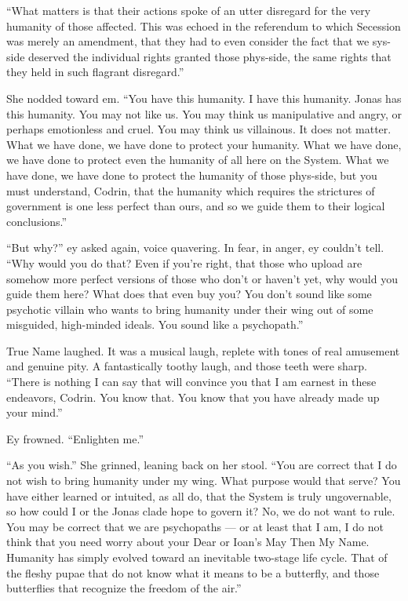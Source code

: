 ``What matters is that their actions spoke of an utter disregard for the very humanity of those affected. This was echoed in the referendum to which Secession was merely an amendment, that they had to even consider the fact that we sys-side deserved the individual rights granted those phys-side, the same rights that they held in such flagrant disregard.''

She nodded toward em. ``You have this humanity. I have this humanity. Jonas has this humanity. You may not like us. You may think us manipulative and angry, or perhaps emotionless and cruel. You may think us villainous. It does not matter. What we have done, we have done to protect your humanity. What we have done, we have done to protect even the humanity of all here on the System. What we have done, we have done to protect the humanity of those phys-side, but you must understand, Codrin, that the humanity which requires the strictures of government is one less perfect than ours, and so we guide them to their logical conclusions.''

``But why?'' ey asked again, voice quavering. In fear, in anger, ey couldn't tell. ``Why would you do that? Even if you're right, that those who upload are somehow more perfect versions of those who don't or haven't yet, why would you guide them here? What does that even buy you? You don't sound like some psychotic villain who wants to bring humanity under their wing out of some misguided, high-minded ideals. You sound like a psychopath.''

True Name laughed. It was a musical laugh, replete with tones of real amusement and genuine pity. A fantastically toothy laugh, and those teeth were sharp. ``There is nothing I can say that will convince you that I am earnest in these endeavors, Codrin. You know that. You know that you have already made up your mind.''

Ey frowned. ``Enlighten me.''

``As you wish.'' She grinned, leaning back on her stool. ``You are correct that I do not wish to bring humanity under my wing. What purpose would that serve? You have either learned or intuited, as all do, that the System is truly ungovernable, so how could I or the Jonas clade hope to govern it? No, we do not want to rule. You may be correct that we are psychopaths — or at least that I am, I do not think that you need worry about your Dear or Ioan's May Then My Name. Humanity has simply evolved toward an inevitable two-stage life cycle. That of the fleshy pupae that do not know what it means to be a butterfly, and those butterflies that recognize the freedom of the air.''

